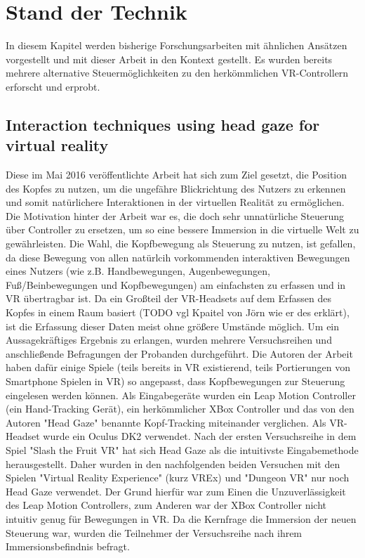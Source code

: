 \chapter{Stand der Technik}
In diesem Kapitel werden bisherige Forschungsarbeiten mit ähnlichen Ansätzen vorgestellt und mit dieser Arbeit in den Kontext gestellt. Es wurden bereits mehrere alternative Steuermöglichkeiten zu den herkömmlichen VR-Controllern erforscht und erprobt. 

\section{Interaction techniques using head gaze for virtual reality}
\label{paper1}
Diese im Mai 2016 veröffentlichte Arbeit hat sich zum Ziel gesetzt, die Position des Kopfes zu nutzen, um die ungefähre Blickrichtung des Nutzers zu erkennen und somit natürlichere Interaktionen in der virtuellen Realität zu ermöglichen. Die Motivation hinter der Arbeit war es, die doch sehr unnatürliche Steuerung über Controller zu ersetzen, um so eine bessere Immersion in die virtuelle Welt zu gewährleisten. Die Wahl, die Kopfbewegung als Steuerung zu nutzen, ist gefallen, da diese Bewegung von allen natürlcih vorkommenden interaktiven Bewegungen eines Nutzers (wie z.B. Handbewegungen, Augenbewegungen, Fuß/Beinbewegungen und Kopfbewegungen) am einfachsten zu erfassen und in VR übertragbar ist. Da ein Großteil der VR-Headsets auf dem Erfassen des Kopfes in einem Raum basiert (TODO vgl Kpaitel von Jörn wie er des erklärt), ist die Erfassung dieser Daten meist ohne größere Umstände möglich. Um ein Aussagekräftiges Ergebnis zu erlangen, wurden mehrere Versuchsreihen und anschließende Befragungen der Probanden durchgeführt. Die Autoren der Arbeit haben dafür einige Spiele (teils bereits in VR existierend, teils Portierungen von Smartphone Spielen in VR) so angepasst, dass Kopfbewegungen zur Steuerung eingelesen werden können. Als Eingabegeräte wurden ein Leap Motion Controller (ein Hand-Tracking Gerät), ein herkömmlicher XBox Controller und das von den Autoren "Head Gaze" benannte Kopf-Tracking miteinander verglichen. Als VR-Headset wurde ein Oculus DK2 verwendet. 
Nach der ersten Versuchsreihe in dem Spiel "Slash the Fruit VR" hat sich Head Gaze als die intuitivste Eingabemethode herausgestellt. Daher wurden in den nachfolgenden beiden Versuchen mit den Spielen "Virtual Reality Experience" (kurz VREx) und "Dungeon VR" nur noch Head Gaze verwendet. Der Grund hierfür war zum Einen die Unzuverlässigkeit des Leap Motion Controllers, zum Anderen war der XBox Controller nicht intuitiv genug für Bewegungen in VR. 
Da die Kernfrage die Immersion der neuen Steuerung war, wurden die Teilnehmer der Versuchsreihe nach ihrem Immersionsbefindnis befragt.

